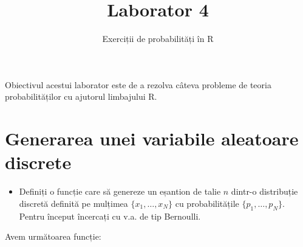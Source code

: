 \documentclass[]{article}
\title{Laborator 4}
\subtitle{Exerciții de probabilități în R}
\author{}
\date{}
\newenvironment{frshaded*}{%
  \def\FrameCommand{\fboxrule=\FrameRule\fboxsep=\FrameSep \fcolorbox{framecolor}{shadecolor1}}%
  \MakeFramed {\advance\hsize-\width \FrameRestore}}%
{\endMakeFramed}
\newenvironment{rmdblock}[1]
  {\begin{frshaded*}
  \begin{itemize}
  \renewcommand{\labelitemi}{
    \raisebox{-.7\height}[0pt][0pt]{
      {\setkeys{Gin}{width=2em,keepaspectratio}\texttt{[image: images/icons/\#1]}}
    }
  }
  \item
  }
  {
  \end{itemize}
  \end{frshaded*}
  }
\newenvironment{rmdexercise}
  {\begin{rmdblock}{exercise}}
  {\end{rmdblock}}
\begin{document}
\maketitle

\thispagestyle{fancy}

Obiectivul acestui laborator este de a rezolva câteva probleme de teoria
probabilităților cu ajutorul limbajului R.

\section{Generarea unei variabile aleatoare
discrete}\label{generarea-unei-variabile-aleatoare-discrete}

\begin{rmdexercise}
Definiți o funcție care să genereze un eșantion de talie \(n\) dintr-o
distribuție discretă definită pe mulțimea \(\{x_1,\dots,x_N\}\) cu
probabilitățile \(\{p_1,\dots,p_N\}\). Pentru început încercați cu v.a.
de tip Bernoulli.
\end{rmdexercise}

Avem următoarea funcție:
\end{document}
